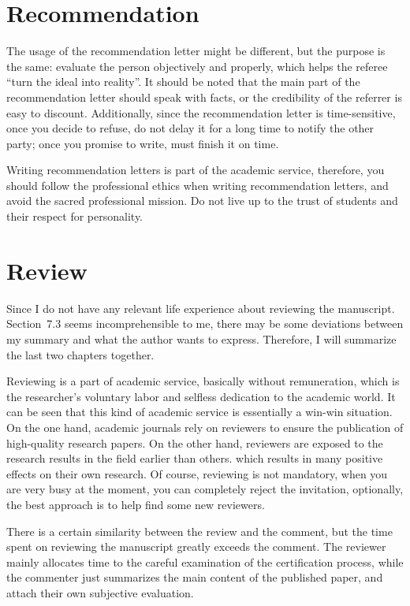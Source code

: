 \section{Recommendation}
The usage of the recommendation letter might be different, but the purpose is the same: evaluate the person objectively and properly, which helps the referee ``turn the ideal into reality''. It should be noted that the main part of the recommendation letter should speak with facts, or the credibility of the referrer is easy to discount. Additionally, since the recommendation letter is time-sensitive, once you decide to refuse, do not delay it for a long time to notify the other party; once you promise to write, must finish it on time.

Writing recommendation letters is part of the academic service, therefore, you should follow the professional ethics when writing recommendation letters, and avoid the sacred professional mission. Do not live up to the trust of students and their respect for personality.



\section{Review}
Since I do not have any relevant life experience about reviewing the manuscript. Section~7.3 seems incomprehensible to me, there may be some deviations between my summary and what the author wants to express. Therefore, I will summarize the last two chapters together.

Reviewing is a part of academic service, basically without remuneration, which is the researcher's voluntary labor and selfless dedication to the academic world.
It can be seen that this kind of academic service is essentially a win-win situation. On the one hand, academic journals rely on reviewers to ensure the publication of high-quality research papers. On the other hand, reviewers are exposed to the research results in the field earlier than others. which results in many positive effects on their own research. Of course, reviewing is not mandatory, when you are very busy at the moment, you can completely reject the invitation, optionally, the best approach is to help find some new reviewers.

There is a certain similarity between the review and the comment, but the time spent on reviewing the manuscript greatly exceeds the comment. The reviewer mainly allocates time to the careful examination of the certification process, while the commenter just summarizes the main content of the published paper, and attach their own subjective evaluation.
